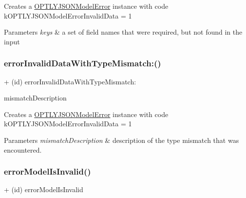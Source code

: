 Creates a \mbox{\hyperlink{interface_o_p_t_l_y_j_s_o_n_model_error}{O\+P\+T\+L\+Y\+J\+S\+O\+N\+Model\+Error}} instance with code k\+O\+P\+T\+L\+Y\+J\+S\+O\+N\+Model\+Error\+Invalid\+Data = 1 
\begin{DoxyParams}{Parameters}
{\em keys} & a set of field names that were required, but not found in the input \\
\hline
\end{DoxyParams}
\mbox{\label{interface_o_p_t_l_y_j_s_o_n_model_error_aeab959fed4cdeb8635770fd28e20edcf}} 
\subsubsection{\texorpdfstring{error\+Invalid\+Data\+With\+Type\+Mismatch\+:()}{errorInvalidDataWithTypeMismatch:()}}
{\footnotesize\ttfamily + (id) error\+Invalid\+Data\+With\+Type\+Mismatch\+: \begin{DoxyParamCaption}\item[{(N\+S\+String $\ast$)}]{mismatch\+Description }\end{DoxyParamCaption}}

Creates a \mbox{\hyperlink{interface_o_p_t_l_y_j_s_o_n_model_error}{O\+P\+T\+L\+Y\+J\+S\+O\+N\+Model\+Error}} instance with code k\+O\+P\+T\+L\+Y\+J\+S\+O\+N\+Model\+Error\+Invalid\+Data = 1 
\begin{DoxyParams}{Parameters}
{\em mismatch\+Description} & description of the type mismatch that was encountered. \\
\hline
\end{DoxyParams}
\mbox{\label{interface_o_p_t_l_y_j_s_o_n_model_error_ad1812b380441a653432ace9492a7e166}} 
\subsubsection{\texorpdfstring{error\+Model\+Is\+Invalid()}{errorModelIsInvalid()}}
{\footnotesize\ttfamily + (id) error\+Model\+Is\+Invalid \begin{DoxyParamCaption}{ }\end{DoxyParamCaption}}


